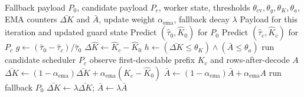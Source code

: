 \begin{algorithm}[t]
  \caption{Online counter guard}
  \label{alg:counter-guard}
  \begin{algorithmic}[1]
    \Require Fallback payload $P_0$, candidate payload $P_c$, worker state,
      thresholds $\theta_{\mathrm{cv}},\theta_g,\theta_K,\theta_a$,
      EMA counters $\bar{\Delta K}$ and $\bar{A}$, update weight $\alpha_{\mathrm{ema}}$,
      fallback decay $\lambda$
    \Ensure Payload for this iteration and updated guard state
    \State Predict $(\hat{\tau}_0,\hat{K}_0)$ for $P_0$
    \State Predict $(\hat{\tau}_c,\hat{K}_c)$ for $P_c$
    \State $g \gets (\hat{\tau}_0-\hat{\tau}_c)/\hat{\tau}_0$
    \State $\Delta \hat{K}\gets \hat{K}_c-\hat{K}_0$
    \State $h\gets(\bar{\Delta K}\le\theta_K)\wedge(\bar{A}\le\theta_a)$
      \State run candidate scheduler $P_c$
      \State observe first-decodable prefix $K_c$ and rows-after-decode $A$
      \State $\bar{\Delta K}\gets(1-\alpha_{\mathrm{ema}})\bar{\Delta K}+\alpha_{\mathrm{ema}}(K_c-\hat{K}_0)$
      \State $\bar{A}\gets(1-\alpha_{\mathrm{ema}})\bar{A}+\alpha_{\mathrm{ema}} A$
    \Else
      \State run fallback $P_0$
      \State $\bar{\Delta K}\gets\lambda\bar{\Delta K}$; $\bar{A}\gets\lambda\bar{A}$
    \EndIf
  \end{algorithmic}
\end{algorithm}
